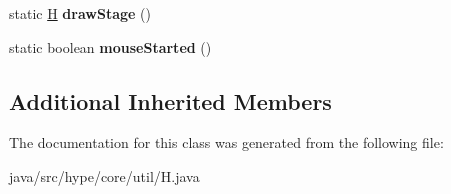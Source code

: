 \begin{DoxyCompactItemize}
\item 
\hypertarget{classhype_1_1core_1_1util_1_1_h_a82706aee994e007c7343e6212f93e3b7}{static \hyperlink{classhype_1_1core_1_1util_1_1_h}{H} {\bfseries draw\-Stage} ()}\label{classhype_1_1core_1_1util_1_1_h_a82706aee994e007c7343e6212f93e3b7}

\item 
\hypertarget{classhype_1_1core_1_1util_1_1_h_acb428f19e54b96814408e769557efaa2}{static boolean {\bfseries mouse\-Started} ()}\label{classhype_1_1core_1_1util_1_1_h_acb428f19e54b96814408e769557efaa2}

\end{DoxyCompactItemize}
\subsection*{Additional Inherited Members}


The documentation for this class was generated from the following file\-:\begin{DoxyCompactItemize}
\item 
java/src/hype/core/util/H.\-java\end{DoxyCompactItemize}
